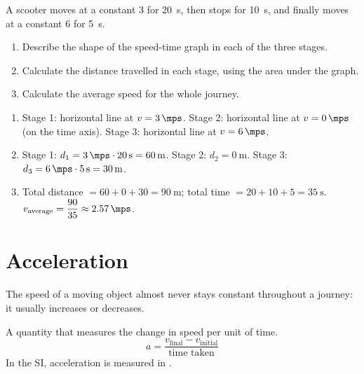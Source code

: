 \begin{exercise}
    A scooter moves at a constant \qty{3}{\mps} for \qty{20}{\s}, then stops for \qty{10}{\s}, and finally moves at a constant \qty{6}{\mps} for \qty{5}{\s}.
    \begin{enumerate}[label=\letraminuscula]
        \item Describe the shape of the speed-time graph in each of the three stages.
        \item Calculate the distance travelled in each stage, using the area under the graph.
        \item Calculate the average speed for the whole journey.
    \end{enumerate}
    \begin{solu}
        \begin{enumerate}[label=\alph*)]
            \item Stage 1: horizontal line at \(v=\qty{3}{\mps}\). Stage 2: horizontal line at \(v=\qty{0}{\mps}\) (on the time axis). Stage 3: horizontal line at \(v=\qty{6}{\mps}\).
            \item Stage 1: \(d_1 = \qty{3}{\mps} \cdot \qty{20}{\s} = \qty{60}{\m}\). Stage 2: \(d_2 = \qty{0}{\m}\). Stage 3: \(d_3 = \qty{6}{\mps} \cdot \qty{5}{\s} = \qty{30}{\m}\).
            \item Total distance \(= 60 + 0 + 30 = \qty{90}{\m}\); total time \(= 20+10+5 = \qty{35}{\s}\). \\
            \(v_{\text{average}} = \dfrac{90}{35} \approx \qty{2.57}{\mps}\).
        \end{enumerate}
    \end{solu}
\end{exercise}


\section{Acceleration}

The speed of a moving object almost never stays constant throughout a journey: it usually increases or decreases.

\begin{definition}[Acceleration]
    A quantity that measures the change in speed per unit of time.
    \begin{equation*}
        a = \dfrac{v_{\text{final}} - v_{\text{initial}}}{\text{time taken}}
    \end{equation*}
    In the SI, acceleration is measured in \unit{\mpss}.
\end{definition}

